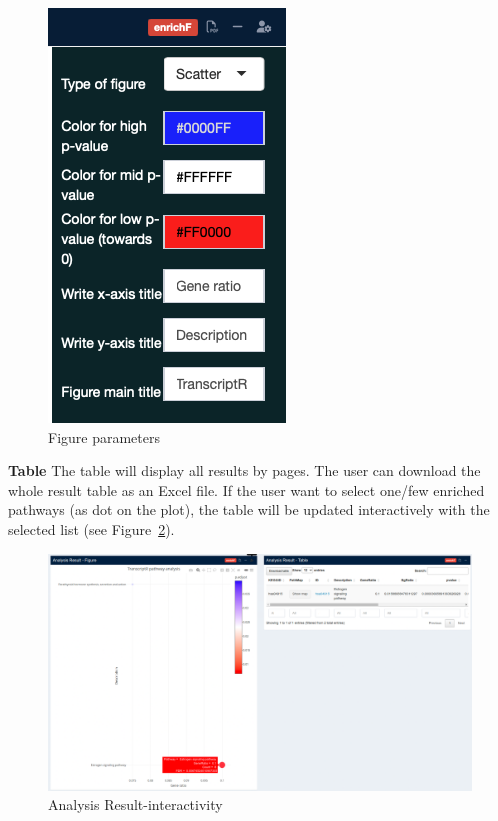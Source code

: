 \documentclass[
  a4paper,
  oneside,
  open=any]{scrreport}
\begin{document}
\begin{figure}[H]

{\centering \includegraphics{./_images/pathway/path1-1.png}

}

\caption{\label{fig-path11}Figure parameters}

\end{figure}

\textbf{Table} The table will display all results by pages. The user can
download the whole result table as an Excel file. If the user want to
select one/few enriched pathways (as dot on the plot), the table will be
updated interactively with the selected list (see
Figure~\ref{fig-path12}).

\begin{figure}[H]

{\centering \includegraphics{./_images/pathway/path1-2.png}

}

\caption{\label{fig-path12}Analysis Result-interactivity}

\end{figure}
\end{document}
